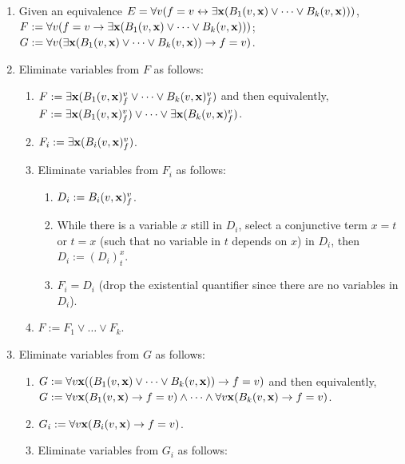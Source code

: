 \documentclass[runningheads]{llncs}
\begin{document}
\begin{enumerate}
\item Given an equivalence $E = \forall v(f = v \leftrightarrow \exists {\bf x} (B_1(v,{\bf x}) \lor \dots \lor B_k(v,{\bf x})))$,
\\$F := \forall v(f = v \rightarrow \exists {\bf x} (B_1(v,{\bf x}) \lor \dots \lor B_k(v,{\bf x})))$;
\\$G := \forall v(\exists {\bf x} (B_1(v,{\bf x}) \lor \dots \lor B_k(v,{\bf x})) \rightarrow f = v)$.

\item Eliminate variables from $F$ as follows:

\begin{enumerate}
\item $F := \exists {\bf x} (B_1(v,{\bf x})^v_f \lor \dots \lor B_k(v,{\bf x})^v_f)$ and then equivalently,
\\$F := \exists {\bf x} (B_1(v,{\bf x})^v_f) \lor \dots \lor \exists {\bf x}(B_k(v,{\bf x})^v_f)$.
\item $F_i := \exists {\bf x} (B_i(v,{\bf x})^v_f)$.
\item Eliminate variables from $F_i$ as follows:

\begin{enumerate}
\item $D_i := B_i(v,{\bf x})^v_f$.
\item While there is a variable $x$ still in $D_i$, select a conjunctive term $x = t$ or $t = x$ (such that no variable in $t$ depends on $x$) in $D_i$, then $D_i := (D_i)^x_t$.
\item $F_i = D_i$ (drop the existential quantifier since there are no variables in $D_i$).
\end{enumerate}

\item $F := F_1 \lor \dots \lor F_k$.
\end{enumerate}

\item Eliminate variables from $G$ as follows:

\begin{enumerate}
\item $G := \forall v{\bf x} ((B_1(v,{\bf x}) \lor \dots \lor B_k(v,{\bf x})) \rightarrow f = v)$ and then equivalently,
\\$G := \forall v{\bf x} (B_1(v,{\bf x})\rightarrow f = v) \land \dots \land \forall v{\bf x} (B_k(v,{\bf x}) \rightarrow f = v)$.
\item $G_i := \forall v{\bf x} (B_i(v,{\bf x})\rightarrow f = v)$.
\item Eliminate variables from $G_i$ as follows:


\end{enumerate}
\end{enumerate}
\end{document}
